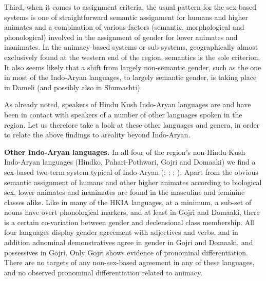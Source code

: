 \documentclass[output=collectionpaper]{langsci/langscibook}
\begin{document}
Third, when it comes  to assignment criteria, the usual pattern for the sex-based systems is one of straightforward semantic assignment for humans and higher animates and a combination of various factors (semantic, morphological and phonological) involved in the assignment of gender for lower animates and inanimates. In the animacy-based systems or sub-systems, geographically almost exclusively found at the western end of the region, semantics is the sole criterion. It also seems likely that a shift from largely non-semantic gender, such as the one in most of the Indo-Aryan languages, to largely semantic gender, is taking place in Dameli (and possibly also in Shumashti).

As already noted, speakers of Hindu Kush Indo-Aryan languages are and have been in contact with speakers of a number of other languages spoken in the region. Let us therefore take a look at these other languages and genera, in order to relate the above findings to areality beyond Indo-Aryan.

\textbf{Other Indo-Aryan languages.} In all four of the region's non-Hindu Kush Indo-Aryan languages (Hindko, Pahari-Pothwari, Gojri and Domaaki) we find a sex-based two-term system typical of Indo-Aryan (\citealt{Rehman2011}; \citealt{Weinreich2011}; \citealt{Kogan2011}; \citealt[105--201]{Losey2002}). Apart from the obvious semantic assignment of humans and other higher animates according to biological sex, lower animates and inanimates are found in the masculine and feminine classes alike. Like in many of the HKIA languages, at a minimum, a sub-set of nouns have overt phonological markers, and at least in Gojri and Domaaki, there is a certain co-variation between gender and declensional class membership. All four languages display gender agreement with adjectives and verbs, and in addition adnominal demonstratives agree in gender in Gojri and Domaaki, and possessives in Gojri. Only Gojri shows evidence of pronominal differentiation. There are no targets of any non-sex-based agreement in any of these languages, and no observed pronominal differentiation related to animacy.
\end{document}
